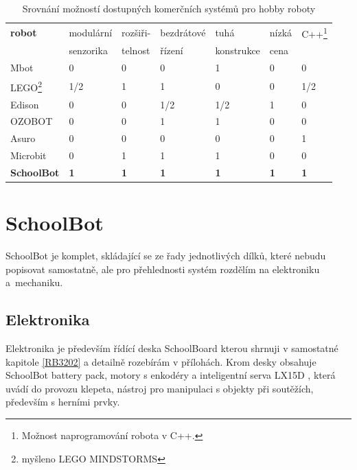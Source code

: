 \documentclass{template/socthesis}
\begin{document}
\begin{table}[h]
	\centering
	\begin{tabular}{|l|l|l|l|l|l|l|}
		\hline
		\textbf{robot }			& modulární   & rozšiři- & bezdrátové  & tuhá  & nízká & C++\footnote{Možnost naprogramování robota v C++.} \\
		 & senzorika & telnost & řízení & konstrukce & cena &  \\
		 \hline
		Mbot 			& 0 				& 0 			& 0 			& 1 			& 0			& 0	\\ 
		LEGO\footnote{myšleno LEGO MINDSTORMS} 	& 1/2 				& 1 			& 1 			& 0 			& 0			& 1/2	\\ 
		Edison 			& 0 				& 0 			& 1/2 			& 1/2 			& 1			& 0	\\ 
		OZOBOT			& 0					& 0				& 1 			& 1				& 0			& 0	\\
		Asuro			& 0					& 0				& 0 			& 0				& 0			& 1	\\
		Microbit		& 0					& 1				& 1 			& 1				& 0			& 0	\\
			\textbf{SchoolBot} 		& \textbf{1} 				& \textbf{1} 			& \textbf{1} 			& \textbf{1} 			& \textbf{1} 		& \textbf{1}	\\ 
		\hline
	\end{tabular}
	\begin{center}
		\caption{Srovnání možností dostupných komerčních systémů pro hobby roboty}
	\end{center}
\end{table}

\chapter{SchoolBot}






SchoolBot je komplet, skládající se ze řady jednotlivých dílků, které nebudu popisovat samostatně, ale pro přehlednosti systém rozdělím na elektroniku a~mechaniku.




\section{Elektronika}

Elektronika je především řídící deska SchoolBoard kterou shrnuji v samostatné kapitole \ref{RB3202} a detailně rozebírám v přílohách. Krom desky obsahuje SchoolBot battery pack, motory s enkodéry a inteligentní serva LX15D
\cite{inteligentni_servo_LX15D}, která uvádí do provozu klepeta, nástroj pro manipulaci s objekty při soutěžích, především s herními prvky.
\end{document}
